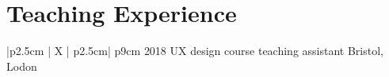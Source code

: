 \section{Teaching Experience}
\begin{mySectionContents}

\iftrue %
\begin{myTableEnv}{|p{2.5cm} | X | p{2.5cm}| p{9cm}}
    \myRow
        {\myPeriod}{2018}
        {\myPosition}{UX design course teaching assistant}
    \myRow
        {\myLocation}{Bristol, Lodon}
        {}{}
    \end{myTableEnv}

\myTablesSeparator
\fi
\end{mySectionContents}